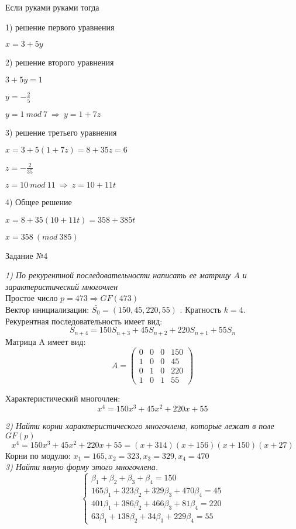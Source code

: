 Если руками руками тогда

1) решение первого уравнения

$x = 3 + 5y$

2) решение второго уравнения

$3 + 5y = 1$

$y = -\frac{2}{5}$

$y = 1 ~ mod ~ 7 ~ \Rightarrow ~ y = 1 + 7z$

3) решение третьего уравнения

$x = 3 + 5(1 + 7z) = 8 + 35z = 6$

$z = -\frac{2}{35}$

$z = 10 ~ mod ~ 11 ~ \Rightarrow ~ z = 10 + 11t$

4) Общее решение

$x = 8 + 35(10 + 11t) = 358 + 385t$

$x = 358 ~ (mod ~ 385)$

\begin{title}
  Задание №4
\end{title}
\emph {1) По рекурентной последовательности написать ее матрицу
$A$ и зарактеристический многочлен}\\
Простое число $p = 473 \Rightarrow GF(473)$\\
Вектор инициализации: $\bar{S_0} = (150, 45, 220, 55)$ . Кратность $k = 4$.\\
Рекурентная последовательность имеет вид:
\[S_{n+4} = 150S_{n+3} + 45S_{n+2} + 220S_{n+1} + 55S_n\]
Матрица A имеет вид:\\

$$
A =
\left(
\begin{array}{lccr}
  0 & 0 & 0 & 150\\
  1 & 0 & 0 & 45\\
  0 & 1 & 0 & 220\\
  1 & 0 & 1 & 55
\end{array}
\right)
$$

Характеристический многочлен:
\[x^4 = 150x^3 + 45x^2 + 220x + 55\]

\emph {2) Найти корни характеристического многочлена, которые лежат в поле
$GF(p)$}\\
\[x^4 = 150x^3 + 45x^2 + 220x + 55 = (x + 314)(x + 156)(x + 150)(x + 27)\]
Корни по модулю: $x_1 = 165, x_2 = 323, x_3 = 329, x_4 = 470$\\

\emph {3) Найти явную форму этого многочлена.}
\begin{equation*}
 \begin{cases}
    \beta_1 + \beta_2 + \beta_3 + \beta_4 = 150\\
    165\beta_1 + 323\beta_2  + 329\beta_3 + 470\beta_4 = 45\\
    401\beta_1 +386 \beta_2 + 466\beta_3 + 81\beta_4 = 220\\
    63\beta_1 + 138\beta_2 + 34\beta_3 + 229\beta_4 = 55
 \end{cases}
\end{equation*}


